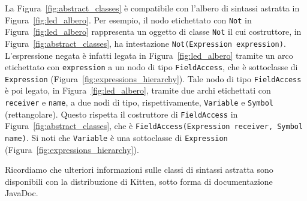 La Figura~\ref{fig:abstract_classes} \`e compatibile
con l'albero di sintassi astratta in Figura~\ref{fig:led_albero}.
Per esempio, il nodo etichettato con
\texttt{Not} in Figura~\ref{fig:led_albero}
rappresenta un oggetto di classe \texttt{Not} il cui
costruttore, in Figura~\ref{fig:abstract_classes}, ha intestazione
\texttt{Not(Expression expression)}. L'espressione negata \`e infatti
legata in Figura~\ref{fig:led_albero} tramite un arco etichettato con
\texttt{expression} a un nodo di tipo \texttt{FieldAccess}, che
\`e sottoclasse di \texttt{Expression}
(Figura~\ref{fig:expressions_hierarchy}).
Tale nodo di tipo \texttt{FieldAccess} \`e poi legato, in
Figura~\ref{fig:led_albero}, tramite due archi etichettati con
\texttt{receiver} e \texttt{name}, a due nodi di tipo, rispettivamente,
\texttt{Variable} e \texttt{Symbol} (rettangolare). Questo
rispetta il costruttore di \texttt{FieldAccess} in
Figura~\ref{fig:abstract_classes}, che \`e
\texttt{FieldAccess(Expression receiver, Symbol name)}.
Si noti che \texttt{Variable} \`e una sottoclasse di \texttt{Expression}
(Figura~\ref{fig:expressions_hierarchy}).

Ricordiamo che ulteriori informazioni sulle classi di sintassi astratta sono
disponibili con la distribuzione di Kitten, sotto forma di documentazione
JavaDoc.
